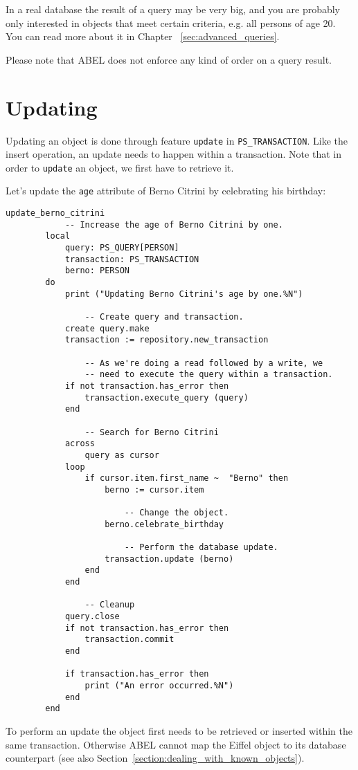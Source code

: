 \documentclass[a4paper,12pt]{report}
\begin{document}
In a real database the result of a query may be very big, and you are probably only interested in objects that meet certain criteria, e.g. all persons of age 20. 
You can read more about it in Chapter ~\ref{sec:advanced_queries}.

Please note that ABEL does not enforce any kind of order on a query result.

\section{Updating}

Updating an object is done through feature \lstinline{update} in \lstinline{PS_TRANSACTION}.
Like the insert operation, an update needs to happen within a transaction.
Note that in order to \lstinline!update! an object, we first have to retrieve it.

Let's update the \lstinline{age} attribute of Berno Citrini by celebrating his birthday:

\begin{lstlisting}[language=OOSC2Eiffel, captionpos=b, caption={Update Berno Citrini's age.}, label={lst:tutorial_update}]
	update_berno_citrini
			-- Increase the age of Berno Citrini by one.
		local
			query: PS_QUERY[PERSON]
			transaction: PS_TRANSACTION
			berno: PERSON
		do
			print ("Updating Berno Citrini's age by one.%N")

				-- Create query and transaction.
			create query.make
			transaction := repository.new_transaction

				-- As we're doing a read followed by a write, we
				-- need to execute the query within a transaction.
			if not transaction.has_error then
				transaction.execute_query (query)
			end

				-- Search for Berno Citrini
			across
				query as cursor
			loop
				if cursor.item.first_name ~  "Berno" then
					berno := cursor.item

						-- Change the object.
					berno.celebrate_birthday

						-- Perform the database update.
					transaction.update (berno)
				end
			end

				-- Cleanup
			query.close
			if not transaction.has_error then
				transaction.commit
			end
			
			if transaction.has_error then
				print ("An error occurred.%N")
			end
		end

\end{lstlisting}

To perform an update the object first needs to be retrieved or inserted within the same transaction.
Otherwise ABEL cannot map the Eiffel object to its database counterpart (see also Section~\ref{section:dealing_with_known_objects}).
\end{document}
